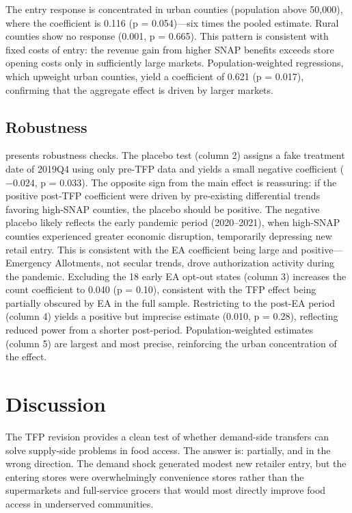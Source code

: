 \documentclass[12pt]{article}
\begin{document}
The entry response is concentrated in urban counties (population above 50,000), where the coefficient is 0.116 (p = 0.054)---six times the pooled estimate. Rural counties show no response (0.001, p = 0.665). This pattern is consistent with fixed costs of entry: the revenue gain from higher SNAP benefits exceeds store opening costs only in sufficiently large markets. Population-weighted regressions, which upweight urban counties, yield a coefficient of 0.621 (p = 0.017), confirming that the aggregate effect is driven by larger markets.

\subsection{Robustness}



 presents robustness checks. The placebo test (column 2) assigns a fake treatment date of 2019Q4 using only pre-TFP data and yields a small negative coefficient ($-0.024$, p = 0.033). The opposite sign from the main effect is reassuring: if the positive post-TFP coefficient were driven by pre-existing differential trends favoring high-SNAP counties, the placebo should be positive. The negative placebo likely reflects the early pandemic period (2020--2021), when high-SNAP counties experienced greater economic disruption, temporarily depressing new retail entry. This is consistent with the EA coefficient being large and positive---Emergency Allotments, not secular trends, drove authorization activity during the pandemic. Excluding the 18 early EA opt-out states (column 3) increases the count coefficient to 0.040 (p = 0.10), consistent with the TFP effect being partially obscured by EA in the full sample. Restricting to the post-EA period (column 4) yields a positive but imprecise estimate (0.010, p = 0.28), reflecting reduced power from a shorter post-period. Population-weighted estimates (column 5) are largest and most precise, reinforcing the urban concentration of the effect.

\section{Discussion}

The TFP revision provides a clean test of whether demand-side transfers can solve supply-side problems in food access. The answer is: partially, and in the wrong direction. The demand shock generated modest new retailer entry, but the entering stores were overwhelmingly convenience stores rather than the supermarkets and full-service grocers that would most directly improve food access in underserved communities.
\end{document}
